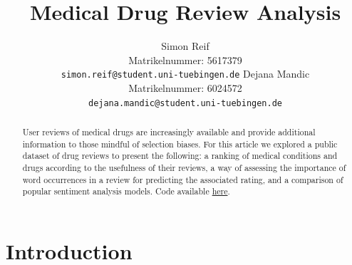 \documentclass{article}
\title{Medical Drug Review Analysis}
\author{%
  Simon Reif\\
  Matrikelnummer: 5617379\\
  \texttt{\small{simon.reif@student.uni-tuebingen.de}}
  \And
  Dejana Mandic\\
  Matrikelnummer: 6024572\\
  \texttt{\small{dejana.mandic@student.uni-tuebingen.de}}
}
\begin{document}
\maketitle

\begin{abstract}
User reviews of medical drugs are increasingly available and provide additional information to those mindful of selection biases. For this article we explored a public dataset of drug reviews to present the following: a ranking of medical conditions and drugs according to the usefulness of their reviews, a way of assessing the importance of word occurrences in a review for predicting the associated rating, and a comparison of popular sentiment analysis models.
Code available \href{https://github.com/dmandic17/medical-drug-review-analysis}{here}. 



\end{abstract}

\section{Introduction}
 
\end{document}
